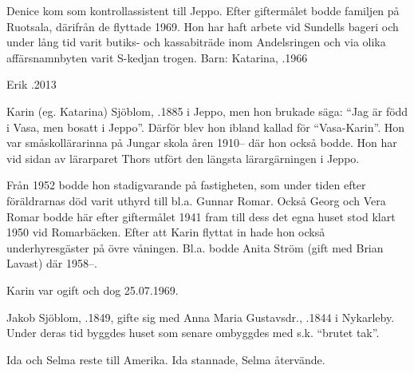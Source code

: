 Denice kom som kontrollassistent till Jeppo. Efter giftermålet bodde familjen på Ruotsala, därifrån de flyttade 1969. Hon har haft arbete vid Sundells bageri och under lång tid varit butiks- och kassabiträde inom Andelsringen och via olika affärsnamnbyten varit S-kedjan trogen.
Barn: Katarina, .1966

Erik .2013


Karin (eg. Katarina) Sjöblom, .1885 i Jeppo, men hon brukade säga: ``Jag är född i Vasa, men bosatt i Jeppo''.  Därför blev hon ibland kallad för ``Vasa-Karin''. Hon var småskollärarinna på Jungar skola åren 1910-- där hon också bodde. Hon har vid sidan av lärarparet Thors utfört den längsta lärargärningen i Jeppo.

Från 1952 bodde hon stadigvarande på fastigheten, som under tiden efter föräldrarnas död varit uthyrd till bl.a. Gunnar Romar. Också Georg och Vera Romar bodde här efter giftermålet 1941 fram till dess det egna huset stod klart 1950 vid Romarbäcken. Efter att Karin flyttat in hade hon också underhyresgäster på övre våningen. Bl.a. bodde Anita Ström (gift med Brian Lavast) där 1958--.

Karin var ogift och dog 25.07.1969.


Jakob Sjöblom, .1849, gifte sig med Anna Maria Gustavsdr., .1844 i Nykarleby. Under deras tid byggdes huset som senare ombyggdes med s.k. ``brutet tak''.
\begin{jhchildren}
  \item {}
  \item {}
  \item {}
  \item {}
  \item {}
  \item {}
  \item {}
\end{jhchildren}

Ida och Selma reste till Amerika. Ida stannade, Selma återvände.



